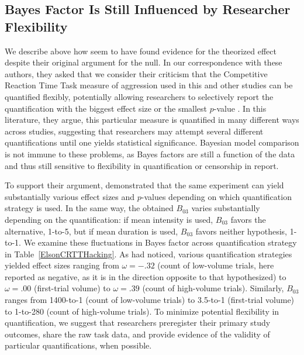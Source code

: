 \documentclass[man]{apa6}
\begin{document}
\subsection{Bayes Factor Is Still Influenced by Researcher Flexibility} 
We describe above how \citet{Elson:etal:2013} seem to have found evidence for the theorized effect despite their original argument for the null. In our correspondence with these authors, they asked that we consider their criticism that the Competitive Reaction Time Task measure of aggression used in this and other studies can be quantified flexibly, potentially allowing researchers to selectively report the quantification with the biggest effect size or the smallest $p$-value \citep{Elson:etal:2014}. In this literature, they argue, this particular measure is quantified in many different ways across studies, suggesting that researchers may attempt several different quantifications until one yields statistical significance. Bayesian model comparison is not immune to these problems, as Bayes factors are still a function of the data and thus still sensitive to flexibility in quantification or censorship in report. 

To support their argument, \citet{Elson:etal:2014} demonstrated that the same experiment can yield substantially various effect sizes and $p$-values depending on which quantification strategy is used. In the same way, the obtained $B_{03}$ varies substantially depending on the quantification: if mean intensity is used, $B_{03}$ favors the alternative, 1-to-5, but if mean duration is used, $B_{03}$ favors neither hypothesis, 1-to-1. We examine these fluctuations in Bayes factor across quantification strategy in Table~\ref{ElsonCRTTHacking}.  As \citet{Elson:etal:2014} had noticed, various quantification strategies yielded effect sizes ranging from $\omega = -.32$ (count of low-volume trials, here reported as negative, as it is in the direction opposite to that hypothesized) to $\omega = .00$ (first-trial volume) to $\omega = .39$ (count of high-volume trials). Similarly, $B_{03}$ ranges from 1400-to-1 (count of low-volume trials) to 3.5-to-1 (first-trial volume) to 1-to-280 (count of high-volume trials). To minimize potential flexibility in quantification, we suggest that researchers preregister their primary study outcomes, share the raw task data, and provide evidence of the validity of particular quantifications, when possible. 
\end{document}
